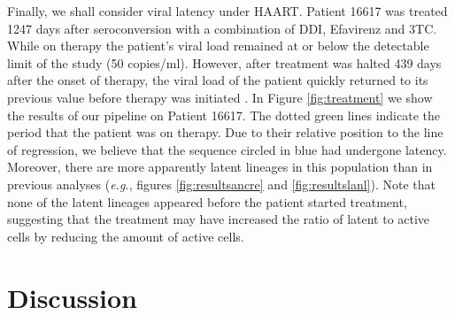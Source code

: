 \documentclass[12pt]{article}
\begin{document}

Finally, we shall consider viral latency under HAART.
Patient 16617 \cite[patient 1180 from][]{Llewellyn06} was treated 1247 days after seroconversion with a combination of DDI, Efavirenz and 3TC.
While on therapy the patient's viral load remained at or below the detectable limit of the study (50 copies/ml).
However, after treatment was halted 439 days after the onset of therapy, the viral load of the patient quickly returned to its previous value before therapy was initiated \citep{Llewellyn06}.
In Figure \ref{fig:treatment} we show the results of our pipeline on Patient 16617.
The dotted green lines indicate the period that the patient was on therapy.
Due to their relative position to the line of regression, we believe that the sequence circled in blue had undergone latency.
Moreover, there are more apparently latent lineages in this population than in previous analyses (\textit{e.g.}, figures \ref{fig:resultsancre} and \ref{fig:resultslanl}).
Note that none of the latent lineages appeared before the patient started treatment, suggesting that the treatment may have increased the ratio of latent to active cells by reducing the amount of active cells.

\section * {Discussion} \label{sec:discuss}
\end{document}

